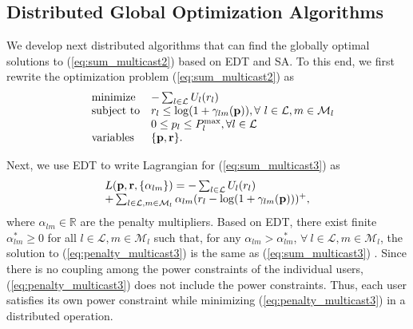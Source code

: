 \documentclass[10pt,journal,letterpaper,compsoc]{IEEEtran}
\begin{document}
{{\subsection{Distributed Global Optimization Algorithms}

We develop next distributed algorithms that can find the globally optimal solutions to (\ref{eq:sum_multicast2}) based on EDT and SA. To this end, we first rewrite the optimization problem (\ref{eq:sum_multicast2}) as
\begin{equation}\begin{array}
[c]{lll}&{\text{minimize} }&-\sum_{l\in\mathcal{L}}U_l(r_l)
\\
&\text{subject to}& r_l\le\log(1+\gamma_{lm}(\mathbf{p})), \forall~l\in\mathcal{L}, m\in\mathcal{M}_l
\\
&& 0\leq p_l\leq P_l^{\max}, \forall l\in\mathcal{L}
\\
& \text{variables}& \{\mathbf{p},\mathbf{r}\}.
\end{array}
\label{eq:sum_multicast3}
\end{equation}

Next, we use EDT to write Lagrangian for (\ref{eq:sum_multicast3}) as
\begin{equation}\begin{array}
[c]{lll}L(\mathbf{p},\mathbf{r},\{\alpha_{lm}\})=-\sum_{l\in\mathcal{L}}U_l(r_l)\\
+\sum_{l\in\mathcal{L}, m\in\mathcal{M}_l}\alpha_{lm}(r_l-\log(1+\gamma_{lm}(\mathbf{p})))^{+},
\end{array}
\label{eq:penalty_multicast3}
\end{equation}
where $\alpha_{lm}\in \mathbb{R}$ are the penalty multipliers. Based on EDT, there exist finite $\alpha_{lm}^*\ge 0$ for all $l\in\mathcal{L}, m\in\mathcal{M}_l$ such that, for any $\alpha_{lm}>\alpha_{lm}^*$, $\forall~l\in\mathcal{L}, m\in\mathcal{M}_l$, the solution to (\ref{eq:penalty_multicast3}) is the same as (\ref{eq:sum_multicast3}) \cite{chen:2008}. Since there is no coupling among the power constraints of the individual users, (\ref{eq:penalty_multicast3}) does not include the power constraints. Thus, each user satisfies its own power constraint while minimizing (\ref{eq:penalty_multicast3}) in a distributed operation.

}}
\end{document}

